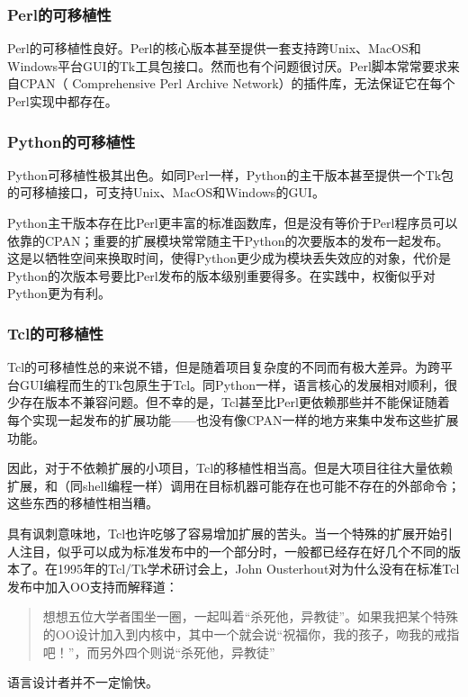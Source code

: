 \documentclass[12pt,oneside]{book}
\begin{document}
\begin{common-format}
\subsubsection{Perl的可移植性}
Perl的可移植性良好。Perl的核心版本甚至提供一套支持跨Unix、MacOS和Windows平台GUI的Tk工具包接口。然而也有个问题很讨厌。Perl脚本常常要求来自CPAN（ Comprehensive Perl Archive Network）的插件库，无法保证它在每个Perl实现中都存在。

\subsubsection{Python的可移植性}
Python可移植性极其出色。如同Perl一样，Python的主干版本甚至提供一个Tk包的可移植接口，可支持Unix、MacOS和Windows的GUI。

Python主干版本存在比Perl更丰富的标准函数库，但是没有等价于Perl程序员可以依靠的CPAN；重要的扩展模块常常随主干Python的次要版本的发布一起发布。这是以牺牲空间来换取时间，使得Python更少成为模块丢失效应的对象，代价是Python的次版本号要比Perl发布的版本级别重要得多。在实践中，权衡似乎对Python更为有利。

\subsubsection{Tcl的可移植性}
Tcl的可移植性总的来说不错，但是随着项目复杂度的不同而有极大差异。为跨平台GUI编程而生的Tk包原生于Tcl。同Python一样，语言核心的发展相对顺利，很少存在版本不兼容问题。但不幸的是，Tcl甚至比Perl更依赖那些并不能保证随着每个实现一起发布的扩展功能——也没有像CPAN一样的地方来集中发布这些扩展功能。

因此，对于不依赖扩展的小项目，Tcl的移植性相当高。但是大项目往往大量依赖扩展，和（同shell编程一样）调用在目标机器可能存在也可能不存在的外部命令；这些东西的移植性相当糟。

具有讽刺意味地，Tcl也许吃够了容易增加扩展的苦头。当一个特殊的扩展开始引人注目，似乎可以成为标准发布中的一个部分时，一般都已经存在好几个不同的版本了。在1995年的Tcl/Tk学术研讨会上，John Ousterhout对为什么没有在标准Tcl发布中加入OO支持而解释道：

\begin{quote}
想想五位大学者围坐一圈，一起叫着“杀死他，异教徒”。如果我把某个特殊的OO设计加入到内核中，其中一个就会说“祝福你，我的孩子，吻我的戒指吧！”，而另外四个则说“杀死他，异教徒”
\end{quote}

语言设计者并不一定愉快。


\end{common-format}
\end{document}
